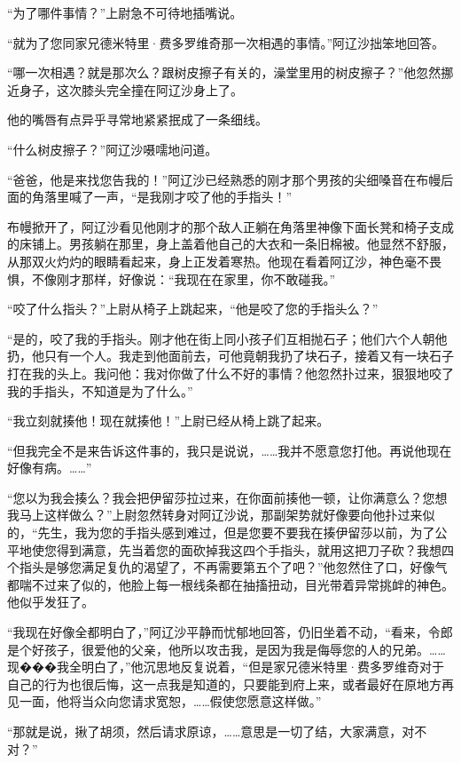 \par “为了哪件事情？”上尉急不可待地插嘴说。
\par “就为了您同家兄德米特里·费多罗维奇那一次相遇的事情。”阿辽沙拙笨地回答。
\par “哪一次相遇？就是那次么？跟树皮擦子有关的，澡堂里用的树皮擦子？”他忽然挪近身子，这次膝头完全撞在阿辽沙身上了。
\par 他的嘴唇有点异乎寻常地紧紧抿成了一条细线。
\par “什么树皮擦子？”阿辽沙嗫嚅地问道。
\par “爸爸，他是来找您告我的！”阿辽沙已经熟悉的刚才那个男孩的尖细嗓音在布幔后面的角落里喊了一声，“是我刚才咬了他的手指头！”
\par 布幔掀开了，阿辽沙看见他刚才的那个敌人正躺在角落里神像下面长凳和椅子支成的床铺上。男孩躺在那里，身上盖着他自己的大衣和一条旧棉被。他显然不舒服，从那双火灼灼的眼睛看起来，身上正发着寒热。他现在看着阿辽沙，神色毫不畏惧，不像刚才那样，好像说：“我现在在家里，你不敢碰我。”
\par “咬了什么指头？”上尉从椅子上跳起来，“他是咬了您的手指头么？”
\par “是的，咬了我的手指头。刚才他在街上同小孩子们互相抛石子；他们六个人朝他扔，他只有一个人。我走到他面前去，可他竟朝我扔了块石子，接着又有一块石子打在我的头上。我问他：我对你做了什么不好的事情？他忽然扑过来，狠狠地咬了我的手指头，不知道是为了什么。”
\par “我立刻就揍他！现在就揍他！”上尉已经从椅上跳了起来。
\par “但我完全不是来告诉这件事的，我只是说说，……我并不愿意您打他。再说他现在好像有病。……”
\par “您以为我会揍么？我会把伊留莎拉过来，在你面前揍他一顿，让你满意么？您想我马上这样做么？”上尉忽然转身对阿辽沙说，那副架势就好像要向他扑过来似的，“先生，我为您的手指头感到难过，但是您要不要我在揍伊留莎以前，为了公平地使您得到满意，先当着您的面砍掉我这四个手指头，就用这把刀子砍？我想四个指头是够您满足复仇的渴望了，不再需要第五个了吧？”他忽然住了口，好像气都喘不过来了似的，他脸上每一根线条都在抽搐扭动，目光带着异常挑衅的神色。他似乎发狂了。
\par “我现在好像全都明白了，”阿辽沙平静而忧郁地回答，仍旧坐着不动，“看来，令郎是个好孩子，很爱他的父亲，他所以攻击我，是因为我是侮辱您的人的兄弟。……现���我全明白了，”他沉思地反复说着，“但是家兄德米特里·费多罗维奇对于自己的行为也很后悔，这一点我是知道的，只要能到府上来，或者最好在原地方再见一面，他将当众向您请求宽恕，……假使您愿意这样做。”
\par “那就是说，揪了胡须，然后请求原谅，……意思是一切了结，大家满意，对不对？”
